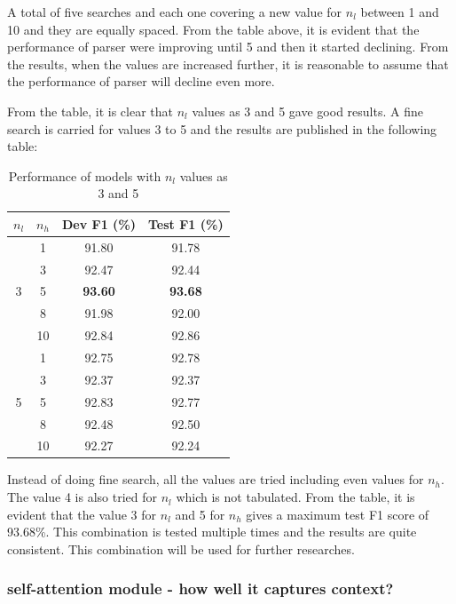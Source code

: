 \documentclass[a4paper, 11pt]{article}
\begin{document}
A total of five searches and each one covering a new value for $n_l$ between 1 and 10 and they are equally spaced. From the table above, it is evident that the performance of parser were improving until 5 and then it started declining. From the results, when the values are increased further, it is reasonable to assume that the performance of parser will decline even more. 

From the table, it is clear that $n_l$ values as 3 and 5 gave good results. A fine search is carried for values 3 to 5 and the results are published in the following table:

\begin{table}[h!]
  \begin{center}
  \def\arraystretch{1.5}%

    \label{tab:fine_search_for_layers_heads}
    \begin{tabular}{c|c|c|c}
      \textbf{$n_l$} & \textbf{$n_h$} & Dev F1 (\%) & Test F1 (\%) \\
      \hline
      \multirow{5}{*}{3} & 1 & 91.80 & 91.78\\
	  & 3 & 92.47 & 92.44\\
	  & 5 & \textbf{93.60} & \textbf{93.68}\\
	  & 8 & 91.98 & 92.00\\
	  & 10 & 92.84 & 92.86\\
	  \hline
      \multirow{5}{*}{5} & 1 & 92.75 & 92.78\\
	  & 3 & 92.37 & 92.37\\
	  & 5 & 92.83 & 92.77\\
	  & 8 & 92.48 & 92.50\\
	  & 10 & 92.27 & 92.24\\
    \end{tabular}
    \caption{Performance of models with $n_l$ values as 3 and 5}
  \end{center}
\end{table}

Instead of doing fine search, all the values are tried including even values for $n_h$. The value 4 is also tried for $n_l$ which is not tabulated. From the table, it is evident that the value 3 for $n_l$ and 5 for $n_h$ gives a maximum test F1 score of 93.68\%. This combination is tested multiple times and the results are quite consistent. This combination will be used for further researches. 

\subsubsection{self-attention module - how well it captures context? }
\end{document}
